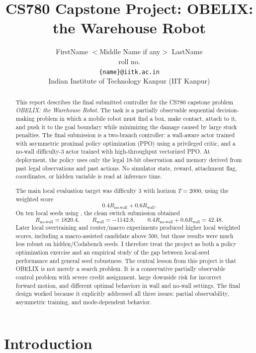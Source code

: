\documentclass[11pt, oneside]{article}   	%
\title{CS780 Capstone Project: 
OBELIX: the Warehouse Robot
}
\author{
    FirstName $<$Middle Name if any$>$ LastName  \\ 
    roll no.\\
   {\tt \{name\}@iitk.ac.in}\\
{Indian Institute of Technology Kanpur (IIT Kanpur)}
}
\date{}							%
\begin{document}
\maketitle

\begin{abstract}
This report describes the final submitted controller for the CS780 capstone problem
\emph{OBELIX: the Warehouse Robot}. The task is a partially observable sequential
decision-making problem in which a mobile robot must find a box, make contact,
attach to it, and push it to the goal boundary while minimizing the damage caused by
large stuck penalties. The final submission is a two-branch controller: a wall-aware
actor trained with asymmetric proximal policy optimization (PPO) using a privileged
critic, and a no-wall difficulty-3 actor trained with high-throughput vectorized PPO.
At deployment, the policy uses only the legal 18-bit observation and memory derived
from past legal observations and past actions. No simulator state, reward, attachment
flag, coordinates, or hidden variable is read at inference time.

The main local evaluation target was difficulty 3 with horizon \(T=2000\), using the
weighted score
\[
  0.4 R_{\text{no-wall}} + 0.6 R_{\text{wall}}.
\]
On ten local seeds using , the clean switch submission obtained
\[
  R_{\text{no-wall}} = 1820.4,
  \qquad
  R_{\text{wall}} = -1142.8,
  \qquad
  0.4R_{\text{no-wall}} + 0.6R_{\text{wall}} = 42.48.
\]
Later local overtraining and router/macro experiments produced higher local weighted
scores, including a macro-assisted candidate above \(500\), but those results were much
less robust on hidden/Codabench seeds. I therefore treat the project as both a policy
optimization exercise and an empirical study of the gap between local-seed performance
and general seed robustness.
The central lesson from this project is that OBELIX is not merely a search problem. It
is a conservative partially observable control problem with severe credit assignment,
large downside risk for incorrect forward motion, and different optimal behaviors in
wall and no-wall settings. The final design worked because it explicitly addressed all
three issues: partial observability, asymmetric training, and mode-dependent behavior.
\end{abstract}

\section{Introduction}
\end{document}

